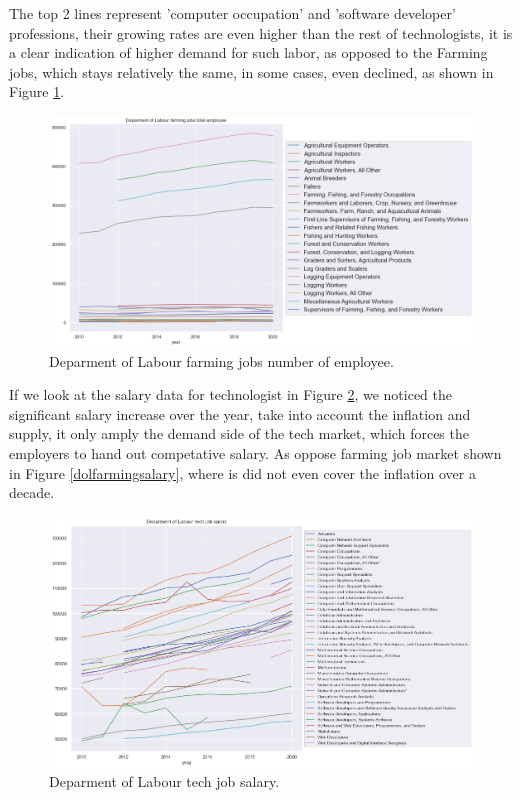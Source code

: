 The top 2 lines represent 'computer occupation' and 'software developer' professions, their growing rates are even higher than the rest of  technologists, it is a clear indication of higher demand for such labor, as opposed to the Farming jobs, which stays relatively the same, in some cases, even declined, as shown in Figure \ref{dolfarming}.
\begin{figure}[h]
	\begin{center}
		\includegraphics[width=\linewidth]{./photos/dolfarming.png}
	\end{center}
	\caption{Deparment of Labour farming jobs number of employee.}
	\label{dolfarming}
\end{figure}
If we look at the salary data for technologist in Figure \ref{techsalary}, we noticed the significant salary increase over the year, take into account the inflation and supply, it only amply the demand side of the tech market, which forces the employers to hand out competative salary. As oppose farming job market shown in Figure \ref{dolfarmingsalary}, where is did not even cover the inflation over a decade.
\begin{figure}[h]
	\begin{center}
		\includegraphics[width=\linewidth]{./photos/departmentoflabour.png}
	\end{center}
	\caption{Deparment of Labour tech job salary.}
	\label{techsalary}
\end{figure}

